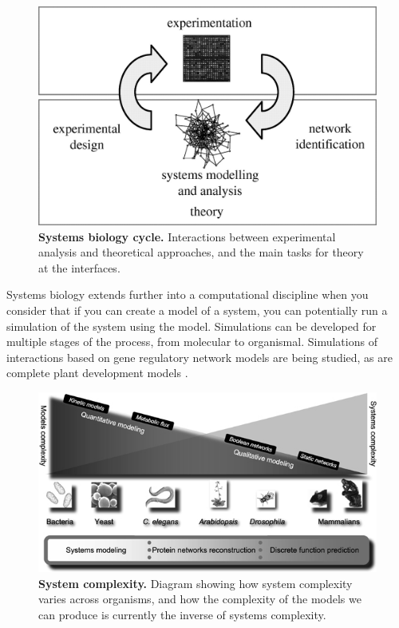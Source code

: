 \begin{figure}[tbp]
 \begin{center}
 \includegraphics[width=14cm]{./01-introduction/data/F1.png}
\end{center}
\caption[{\bf Systems biology cycle.}]{{\bf Systems biology cycle.} Interactions between experimental analysis and theoretical approaches, and the main tasks for theory at the interfaces. \protect\citet{Doyle2006}
\label{fig:systems-biology}}
\end{figure}

Systems biology extends further into a computational discipline when you consider that if you can create a model of a system, you can potentially run a simulation of the system using the model. Simulations can be developed for multiple stages of the process, from molecular to organismal. Simulations of interactions based on gene regulatory network models are being studied\cite{Valencia2002}, as are complete plant development models \cite{Mundermann2005,Prusinkiewicz2004,Prusinkiewicz2006}.

\begin{figure}[tbp]
 \centering
 \includegraphics[width=14cm]{./01-introduction/data/msb4100080-f1.png}
\caption[{\bf System complexity.}]{{\bf System complexity.} Diagram showing how system complexity varies across organisms, and how the complexity of the models we can produce is currently the inverse of systems complexity. \citet{Kahlem2006}
\label{fig:systems-power}}
\end{figure}

